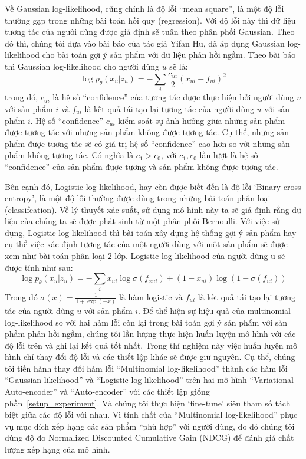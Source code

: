     Về Gaussian  log-likelihood, cũng chính là độ lỗi ``mean square'', là một độ lỗi thường gặp trong những bài toán hồi quy (regression). 
    Với độ lỗi này thì dữ liệu tương tác của người dùng được giả định sẽ tuân theo phân phối Gaussian. 
    Theo đó thì, chúng tôi dựa vào bài báo \cite{yifan_cf} của tác giả Yifan Hu, đã áp dụng Gaussian log-likelihood cho bài toán gợi ý sản phẩm với dữ liệu phản hồi ngầm. 
    Theo bài báo thì Gaussian log-likelihood cho người dùng $u$ sẽ là:
    \begin{equation}
        \log p_\theta(x_u|z_u) = -\sum_i \frac{c_{ui}}{2}(x_{ui} - f_{ui})^2
    \end{equation}
    trong đó, $c_{ui}$ là hệ số ``confidence'' của tương tác được thực hiện bởi người dùng $u$ với sản phẩm $i$ và $f_{ui}$ là kết quả tái tạo lại tương tác của người dùng $u$ với sản phẩm $i$.
    Hệ số ``confidence'' $c_{ui}$ kiểm soát sự ảnh hưởng giữa những sản phẩm được tương tác với những sản phẩm không được tương tác.
    Cụ thể, những sản phẩm được tương tác sẽ có giá trị hệ số ``confidence'' cao hơn so với những sản phẩm không tương tác.
    Có nghĩa là $c_{1}  > c_0$, với $c_1,c_0$ lần lượt là hệ số ``confidence'' của sản phẩm được tương và sản phẩm không được tương tác. 
    
    Bên cạnh đó, Logistic log-likelihood, hay còn được biết đến là độ lỗi `Binary cross entropy', là một độ lỗi thường được dùng trong những bài toán phân loại (classifcation).
    Về lý thuyết xác suất, sử dụng mô hình này ta sẽ giả định rằng dữ liệu của chúng ta sẽ được phát sinh từ một phân phối Bernoulli. 
    Với việc sử dụng, Logistic log-likelihood thì bài toán xây dựng hệ thống gợi ý sản phẩm hay cụ thể việc xác định tương tác của một người dùng với một sản phẩm sẽ được xem như bài toán phân loại 2 lớp. 
    Logistic log-likelihood của người dùng u sẽ được tính như sau:
    \begin{equation}
        \log p_\theta(x_u|z_u) = -\sum_i x_{ui}\log \sigma(f_{xui}) + (1-x_{ui})\log(1 - \sigma(f_{ui}))
    \end{equation}
    Trong đó $\sigma(x) = \frac{1}{1+\exp (-x)}$ là hàm logistic và  $f_{ui}$ là kết quả tái tạo lại tương tác của người dùng $u$ với sản phẩm $i$.
    Để thể hiện sự hiệu quả của multinomial log-likelihood so với hai hàm lỗi còn lại trong bài toán gợi ý sản phẩm với sản phầm phản hồi ngầm, chúng tôi lần lượng thực hiện huấn luyện mô hình với các độ lỗi trên và ghi lại kết quả tốt nhất. 
    Trong thí nghiệm này việc huấn luyện mô hình chỉ thay đổi độ lỗi và các thiết lập khác sẽ được giữ nguyên.
    Cụ thể, chúng tôi tiến hành thay đổi hàm lỗi ``Multinomial log-likelihood'' thành các hàm lỗi ``Gaussian likelihood'' và ``Logistic log-likelihood'' trên hai mô hình ``Variational Auto-encoder'' và ``Auto-encoder'' với các thiết lập giống phần~\ref{setup_experiment}.
    Và chúng tôi thực hiện `fine-tune' siêu tham số tách biệt giữa các độ lỗi với nhau.
    Vì tính chất của ``Multinomial log-likelihood'' phục vụ mục đích xếp hạng các sản phẩm ``phù hợp'' với người dùng, do đó chúng tôi dùng độ đo Normalized Discounted Cumulative Gain (NDCG) để đánh giá chất lượng xếp hạng của mô hình. 
    
